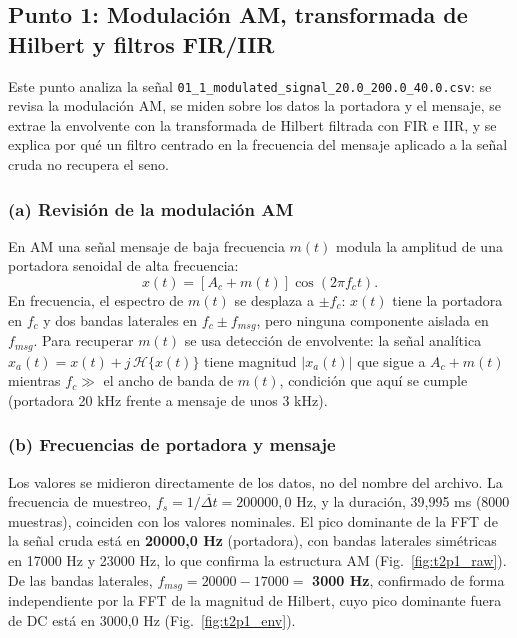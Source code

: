 
\subsection{Punto 1: Modulación AM, transformada de Hilbert y filtros FIR/IIR}

Este punto analiza la señal \texttt{01\_1\_modulated\_signal\_20.0\_200.0\_40.0.csv}: se revisa la modulación AM, se miden sobre los datos la portadora y el mensaje, se extrae la envolvente con la transformada de Hilbert filtrada con FIR e IIR, y se explica por qué un filtro centrado en la frecuencia del mensaje aplicado a la señal cruda no recupera el seno.

\subsubsection{(a) Revisión de la modulación AM}

En AM una señal mensaje de baja frecuencia $m(t)$ modula la amplitud de una portadora senoidal de alta frecuencia:
\begin{equation}
x(t) = \left[A_c + m(t)\right]\cos(2\pi f_c t).
\label{eq:t2p1_am}
\end{equation}
En frecuencia, el espectro de $m(t)$ se desplaza a $\pm f_c$: $x(t)$ tiene la portadora en $f_c$ y dos bandas laterales en $f_c \pm f_{msg}$, pero ninguna componente aislada en $f_{msg}$. Para recuperar $m(t)$ se usa detección de envolvente: la señal analítica $x_a(t) = x(t) + j\,\mathcal{H}\{x(t)\}$ tiene magnitud $|x_a(t)|$ que sigue a $A_c + m(t)$ mientras $f_c \gg$ el ancho de banda de $m(t)$, condición que aquí se cumple (portadora 20 kHz frente a mensaje de unos 3 kHz).

\subsubsection{(b) Frecuencias de portadora y mensaje}

Los valores se midieron directamente de los datos, no del nombre del archivo. La frecuencia de muestreo, $f_s = 1/\overline{\Delta t} = 200000{,}0$ Hz, y la duración, 39,995 ms (8000 muestras), coinciden con los valores nominales. El pico dominante de la FFT de la señal cruda está en \textbf{20000,0 Hz} (portadora), con bandas laterales simétricas en 17000 Hz y 23000 Hz, lo que confirma la estructura AM (Fig.~\ref{fig:t2p1_raw}). De las bandas laterales, $f_{msg} = 20000 - 17000 = $ \textbf{3000 Hz}, confirmado de forma independiente por la FFT de la magnitud de Hilbert, cuyo pico dominante fuera de DC está en 3000,0 Hz (Fig.~\ref{fig:t2p1_env}).

